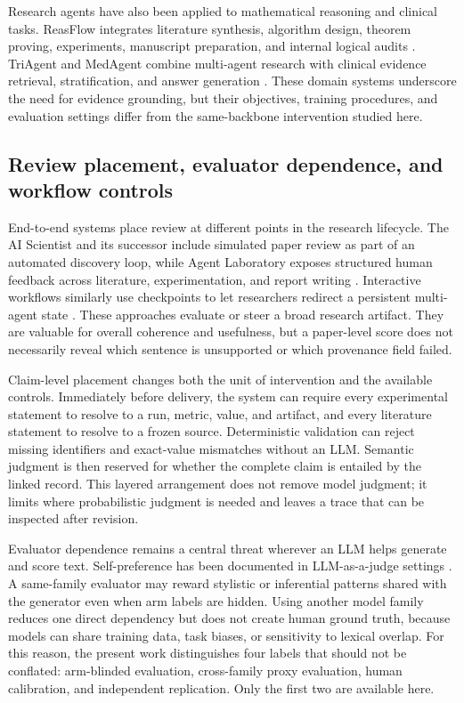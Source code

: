 \documentclass[11pt]{article}
\begin{document}
Research agents have also been applied to mathematical reasoning and clinical tasks. ReasFlow integrates literature synthesis, algorithm design, theorem proving, experiments, manuscript preparation, and internal logical audits \cite{reasflow}. TriAgent and MedAgent combine multi-agent research with clinical evidence retrieval, stratification, and answer generation \cite{triagent,medagent}. These domain systems underscore the need for evidence grounding, but their objectives, training procedures, and evaluation settings differ from the same-backbone intervention studied here.

\subsection{Review placement, evaluator dependence, and workflow controls}

End-to-end systems place review at different points in the research lifecycle. The AI Scientist and its successor include simulated paper review as part of an automated discovery loop, while Agent Laboratory exposes structured human feedback across literature, experimentation, and report writing \cite{aiscientist,aiscientistv2,agentlab}. Interactive workflows similarly use checkpoints to let researchers redirect a persistent multi-agent state \cite{rethink}. These approaches evaluate or steer a broad research artifact. They are valuable for overall coherence and usefulness, but a paper-level score does not necessarily reveal which sentence is unsupported or which provenance field failed.

Claim-level placement changes both the unit of intervention and the available controls. Immediately before delivery, the system can require every experimental statement to resolve to a run, metric, value, and artifact, and every literature statement to resolve to a frozen source. Deterministic validation can reject missing identifiers and exact-value mismatches without an LLM. Semantic judgment is then reserved for whether the complete claim is entailed by the linked record. This layered arrangement does not remove model judgment; it limits where probabilistic judgment is needed and leaves a trace that can be inspected after revision.

Evaluator dependence remains a central threat wherever an LLM helps generate and score text. Self-preference has been documented in LLM-as-a-judge settings \cite{selfpreference}. A same-family evaluator may reward stylistic or inferential patterns shared with the generator even when arm labels are hidden. Using another model family reduces one direct dependency but does not create human ground truth, because models can share training data, task biases, or sensitivity to lexical overlap. For this reason, the present work distinguishes four labels that should not be conflated: arm-blinded evaluation, cross-family proxy evaluation, human calibration, and independent replication. Only the first two are available here.
\end{document}
